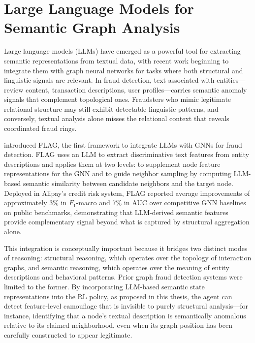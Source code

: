 \section{Large Language Models for Semantic Graph Analysis}

Large language models (LLMs) have emerged as a powerful tool for extracting semantic
representations from textual data, with recent work beginning to integrate them with
graph neural networks for tasks where both structural and linguistic signals are relevant.
In fraud detection, text associated with entities—review content, transaction
descriptions, user profiles—carries semantic anomaly signals that complement topological
ones. Fraudsters who mimic legitimate relational structure may still exhibit detectable
linguistic patterns, and conversely, textual analysis alone misses the relational context
that reveals coordinated fraud rings.

\cite{yang2025flag} introduced FLAG, the first framework to integrate LLMs with GNNs
for fraud detection. FLAG uses an LLM to extract discriminative text features from
entity descriptions and applies them at two levels: to supplement node feature
representations for the GNN and to guide neighbor sampling by computing LLM-based
semantic similarity between candidate neighbors and the target node. Deployed in Alipay's
credit risk system, FLAG reported average improvements of approximately 3\% in
$F_1$-macro and 7\% in AUC over competitive GNN baselines on public benchmarks,
demonstrating that LLM-derived semantic features provide complementary signal beyond
what is captured by structural aggregation alone.

This integration is conceptually important because it bridges two distinct modes of
reasoning: structural reasoning, which operates over the topology of interaction graphs,
and semantic reasoning, which operates over the meaning of entity descriptions and
behavioral patterns. Prior graph fraud detection systems were limited to the former.
By incorporating LLM-based semantic state representations into the RL policy, as
proposed in this thesis, the agent can detect feature-level camouflage that is invisible
to purely structural analysis—for instance, identifying that a node's textual description
is semantically anomalous relative to its claimed neighborhood, even when its graph
position has been carefully constructed to appear legitimate.

